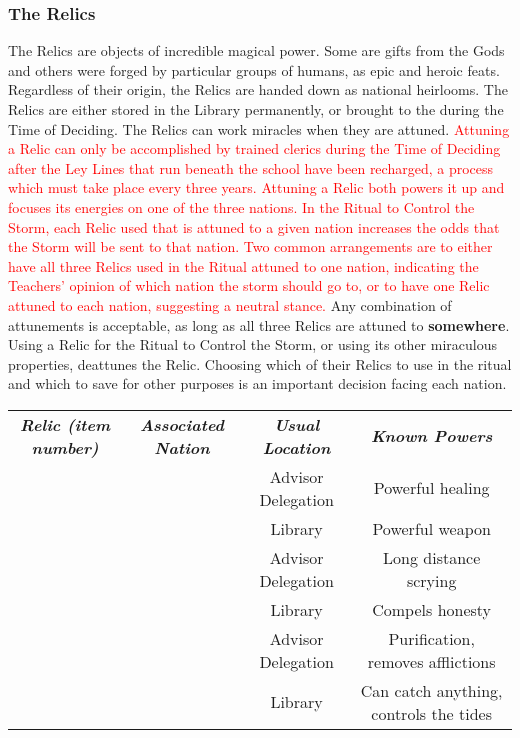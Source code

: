 \documentclass[blue]{GL2020}
\begin{document}
\subsubsection*{The Relics}
The Relics are objects of incredible magical power. Some are gifts from the Gods and others were forged by particular groups of humans, as epic and heroic feats. Regardless of their origin, the Relics are handed down as national heirlooms. The Relics are either stored in the \pSchool{} Library permanently, or brought to the \pSc{} during the Time of Deciding. The Relics can work miracles when they are attuned. \textcolor{red}{Attuning a Relic can only be accomplished by trained clerics during the Time of Deciding after the Ley Lines that run beneath the school have been recharged, a process which must take place every three years. Attuning a Relic both powers it up and focuses its energies on one of the three nations. In the Ritual to Control the Storm, each Relic used that is attuned to a given nation increases the odds that the Storm will be sent to that nation. Two common arrangements are to either have all three Relics used in the Ritual attuned to one nation, indicating the Teachers’ opinion of which nation the storm should go to, or to have one Relic attuned to each nation, suggesting a neutral stance.} Any combination of attunements is acceptable, as long as all three Relics are attuned to \textbf{somewhere}. Using a Relic for the Ritual to Control the Storm, or using its other miraculous properties, deattunes the Relic. Choosing which of their Relics to use in the ritual and which to save for other purposes is an important decision facing each nation.

\begin{tabularx}{\textwidth}{|>{\centering\arraybackslash}c | >{\centering\arraybackslash}c | >{\centering\arraybackslash}c | >{\centering\arraybackslash}c |}
\hline
    \multicolumn{4}{|c|}{\textbf{The Relics}} \\
\hline
    \emph{\textbf{Relic (item number)}} & \emph{\textbf{Associated Nation}} & \emph{\textbf{Usual Location}} & \emph{\textbf{Known Powers}}\\
\hline
    \iPitcher{} & \pFarm{} & Advisor Delegation & Powerful healing\\
\hline
    \iScythe{} & \pFarm{} & Library & Powerful weapon\\
\hline
    \iMirror{} & \pTech{} & Advisor Delegation & Long distance scrying\\
\hline
    \iLariat{} & \pTech{} & Library & Compels honesty\\
\hline
    \iChalice{} & \pShip{} & Advisor Delegation & Purification, removes afflictions\\
\hline
    \iNet{} & \pShip{} & Library & Can catch anything, controls the tides\\
\hline
\end{tabularx}
\end{document}
